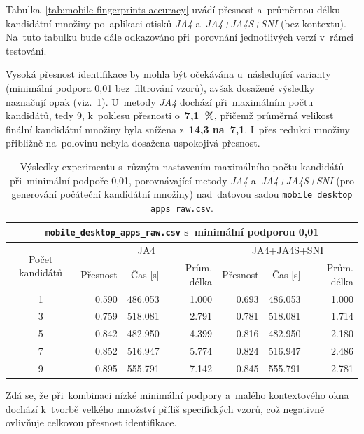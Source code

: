 Tabulka~\ref{tab:mobile-fingerprints-accuracy} uvádí přesnost a~průměrnou délku kandidátní množiny po~aplikaci otisků \textit{JA4} a~\textit{JA4+JA4S+SNI} (bez kontextu). Na~tuto tabulku bude dále odkazováno při~porovnání jednotlivých verzí v~rámci testování.

Vysoká přesnost identifikace by mohla být očekávána u~následující varianty (minimální podpora 0{,}01 bez~filtrování vzorů), avšak dosažené výsledky naznačují opak (viz.~\ref{tab:mobile-001}). U~metody \textit{JA4} dochází při~maximálním počtu kandidátů, tedy 9, k~poklesu přesnosti o~\textbf{7{,}1~\%}, přičemž průměrná velikost finální kandidátní množiny byla snížena z~\textbf{14{,}3 na~7{,}1}. I~přes redukci množiny přibližně na~polovinu nebyla dosažena uspokojivá přesnost.
\begin{table}[H]
	\centering
	\begin{tabular}{c|rrr|rrr}
		\toprule
		\multicolumn{7}{c}{\texttt{mobile\_desktop\_apps\_raw.csv} s~minimální podporou 0{,}01}  \\
		\midrule
		\multirow{2}{*}{Počet kandidátů} & \multicolumn{3}{c}{JA4} & \multicolumn{3}{c}{JA4+JA4S+SNI}\\
		  & Přesnost & Čas [s] & Prům. délka & Přesnost & Čas [s] & Prům. délka \\
		\midrule
		1 & 0.590     & 486.053  & 1.000         & 0.693     & 486.053  & 1.000         \\
		3 & 0.759     & 518.081  & 2.791         & 0.781     & 518.081  & 1.714         \\
		5 & 0.842     & 482.950  & 4.399         & 0.816     & 482.950  & 2.180         \\
		7 & 0.852     & 516.947  & 5.774         & 0.824     & 516.947  & 2.486         \\
		9 & 0.895     & 555.791  & 7.142         & 0.845     & 555.791  & 2.781         \\
		\bottomrule
	\end{tabular}
	\caption{Výsledky experimentu s~různým nastavením maximálního počtu kandidátů při~minimální podpoře 0{,}01, porovnávající metody \textit{JA4} a~\textit{JA4+JA4S+SNI} (pro generování počáteční kandidátní množiny) nad~datovou sadou \texttt{mobile desktop apps raw.csv}.}
	\label{tab:mobile-001}
\end{table}

Zdá se, že při~kombinaci nízké minimální podpory a~malého kontextového okna dochází k~tvorbě velkého množství příliš specifických vzorů, což negativně ovlivňuje celkovou přesnost identifikace.

